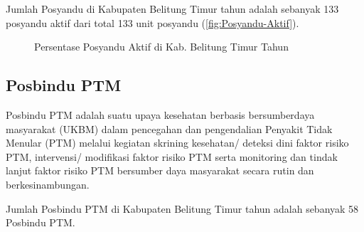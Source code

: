 Jumlah Posyandu di Kabupaten Belitung Timur tahun \tP adalah sebanyak 133 posyandu aktif dari total 133 unit posyandu (\autoref{fig:Posyandu-Aktif}).

\begin{figure}[H]
	\centering{}
	\caption{Persentase Posyandu Aktif di Kab. Belitung Timur Tahun \tP}
	\label{fig:Posyandu-Aktif}
\end{figure}

\subsection{Posbindu PTM}
Posbindu PTM adalah suatu upaya kesehatan berbasis bersumberdaya masyarakat (UKBM) dalam pencegahan dan pengendalian Penyakit Tidak Menular (PTM) melalui kegiatan skrining kesehatan/ deteksi dini faktor risiko PTM, intervensi/ modifikasi faktor risiko PTM serta monitoring dan tindak lanjut faktor risiko PTM bersumber daya masyarakat secara rutin dan berkesinambungan.

Jumlah Posbindu PTM di Kabupaten Belitung Timur tahun \tP adalah sebanyak 58 Posbindu PTM. %
